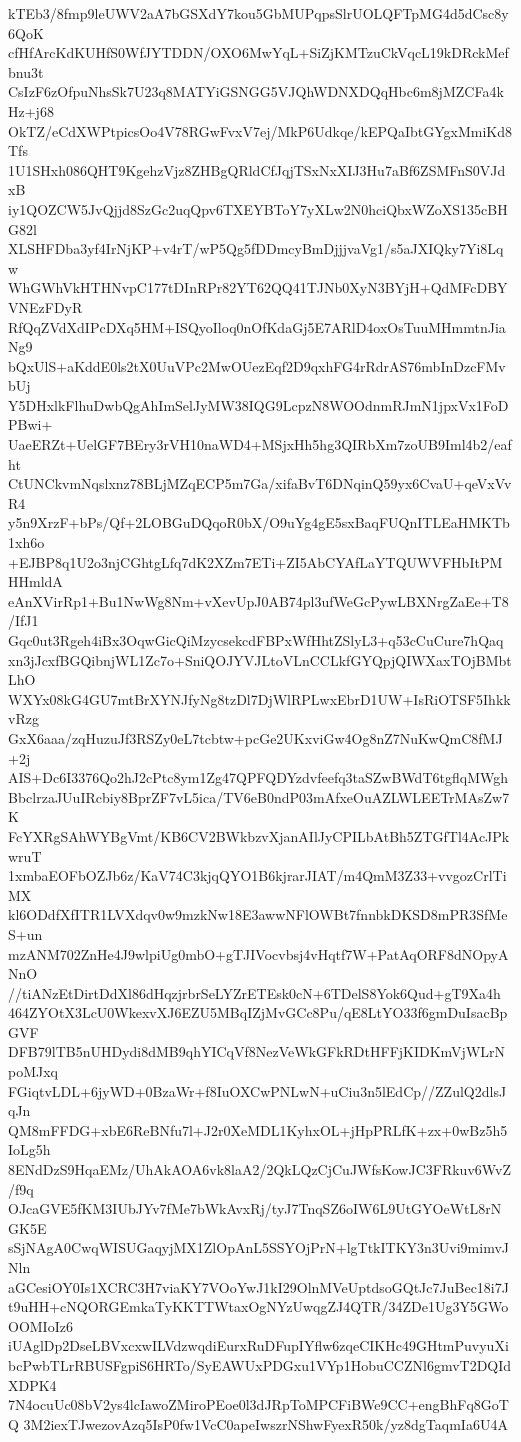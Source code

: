 kTEb3/8fmp9leUWV2aA7bGSXdY7kou5GbMUPqpsSlrUOLQFTpMG4d5dCsc8y6QoK
cfHfArcKdKUHfS0WfJYTDDN/OXO6MwYqL+SiZjKMTzuCkVqcL19kDRckMefbnu3t
CsIzF6zOfpuNhsSk7U23q8MATYiGSNGG5VJQhWDNXDQqHbc6m8jMZCFa4kHz+j68
OkTZ/eCdXWPtpicsOo4V78RGwFvxV7ej/MkP6Udkqe/kEPQaIbtGYgxMmiKd8Tfs
1U1SHxh086QHT9KgehzVjz8ZHBgQRldCfJqjTSxNxXIJ3Hu7aBf6ZSMFnS0VJdxB
iy1QOZCW5JvQjjd8SzGc2uqQpv6TXEYBToY7yXLw2N0hciQbxWZoXS135cBHG82l
XLSHFDba3yf4IrNjKP+v4rT/wP5Qg5fDDmcyBmDjjjvaVg1/s5aJXIQky7Yi8Lqw
WhGWhVkHTHNvpC177tDInRPr82YT62QQ41TJNb0XyN3BYjH+QdMFcDBYVNEzFDyR
RfQqZVdXdIPcDXq5HM+ISQyoIloq0nOfKdaGj5E7ARlD4oxOsTuuMHmmtnJiaNg9
bQxUlS+aKddE0ls2tX0UuVPc2MwOUezEqf2D9qxhFG4rRdrAS76mbInDzcFMvbUj
Y5DHxlkFlhuDwbQgAhImSelJyMW38IQG9LcpzN8WOOdnmRJmN1jpxVx1FoDPBwi+
UaeERZt+UelGF7BEry3rVH10naWD4+MSjxHh5hg3QIRbXm7zoUB9Iml4b2/eafht
CtUNCkvmNqslxnz78BLjMZqECP5m7Ga/xifaBvT6DNqinQ59yx6CvaU+qeVxVvR4
y5n9XrzF+bPs/Qf+2LOBGuDQqoR0bX/O9uYg4gE5sxBaqFUQnITLEaHMKTb1xh6o
+EJBP8q1U2o3njCGhtgLfq7dK2XZm7ETi+ZI5AbCYAfLaYTQUWVFHbItPMHHmldA
eAnXVirRp1+Bu1NwWg8Nm+vXevUpJ0AB74pl3ufWeGcPywLBXNrgZaEe+T8/IfJ1
Gqc0ut3Rgeh4iBx3OqwGicQiMzycsekcdFBPxWfHhtZSlyL3+q53cCuCure7hQaq
xn3jJcxfBGQibnjWL1Zc7o+SniQOJYVJLtoVLnCCLkfGYQpjQIWXaxTOjBMbtLhO
WXYx08kG4GU7mtBrXYNJfyNg8tzDl7DjWlRPLwxEbrD1UW+IsRiOTSF5IhkkvRzg
GxX6aaa/zqHuzuJf3RSZy0eL7tcbtw+pcGe2UKxviGw4Og8nZ7NuKwQmC8fMJ+2j
AIS+Dc6I3376Qo2hJ2cPtc8ym1Zg47QPFQDYzdvfeefq3taSZwBWdT6tgflqMWgh
BbclrzaJUuIRcbiy8BprZF7vL5ica/TV6eB0ndP03mAfxeOuAZLWLEETrMAsZw7K
FcYXRgSAhWYBgVmt/KB6CV2BWkbzvXjanAIlJyCPILbAtBh5ZTGfTl4AcJPkwruT
1xmbaEOFbOZJb6z/KaV74C3kjqQYO1B6kjrarJIAT/m4QmM3Z33+vvgozCrlTiMX
kl6ODdfXfITR1LVXdqv0w9mzkNw18E3awwNFlOWBt7fnnbkDKSD8mPR3SfMeS+un
mzANM702ZnHe4J9wlpiUg0mbO+gTJIVocvbsj4vHqtf7W+PatAqORF8dNOpyANnO
//tiANzEtDirtDdXl86dHqzjrbrSeLYZrETEsk0cN+6TDelS8Yok6Qud+gT9Xa4h
464ZYOtX3LcU0WkexvXJ6EZU5MBqIZjMvGCc8Pu/qE8LtYO33f6gmDuIsacBpGVF
DFB79lTB5nUHDydi8dMB9qhYICqVf8NezVeWkGFkRDtHFFjKIDKmVjWLrNpoMJxq
FGiqtvLDL+6jyWD+0BzaWr+f8IuOXCwPNLwN+uCiu3n5lEdCp//ZZulQ2dlsJqJn
QM8mFFDG+xbE6ReBNfu7l+J2r0XeMDL1KyhxOL+jHpPRLfK+zx+0wBz5h5IoLg5h
8ENdDzS9HqaEMz/UhAkAOA6vk8laA2/2QkLQzCjCuJWfsKowJC3FRkuv6WvZ/f9q
OJcaGVE5fKM3IUbJYv7fMe7bWkAvxRj/tyJ7TnqSZ6oIW6L9UtGYOeWtL8rNGK5E
sSjNAgA0CwqWISUGaqyjMX1ZlOpAnL5SSYOjPrN+lgTtkITKY3n3Uvi9mimvJNln
aGCesiOY0Is1XCRC3H7viaKY7VOoYwJ1kI29OlnMVeUptdsoGQtJc7JuBec18i7J
t9uHH+cNQORGEmkaTyKKTTWtaxOgNYzUwqgZJ4QTR/34ZDe1Ug3Y5GWoOOMIoIz6
iUAglDp2DseLBVxcxwILVdzwqdiEurxRuDFupIYflw6zqeCIKHc49GHtmPuvyuXi
bcPwbTLrRBUSFgpiS6HRTo/SyEAWUxPDGxu1VYp1HobuCCZNl6gmvT2DQIdXDPK4
7N4ocuUc08bV2ys4lcIawoZMiroPEoe0l3dJRpToMPCFiBWe9CC+engBhFq8GoTQ
3M2iexTJwezovAzq5IsP0fw1VcC0apeIwszrNShwFyexR50k/yz8dgTaqmIa6U4A
